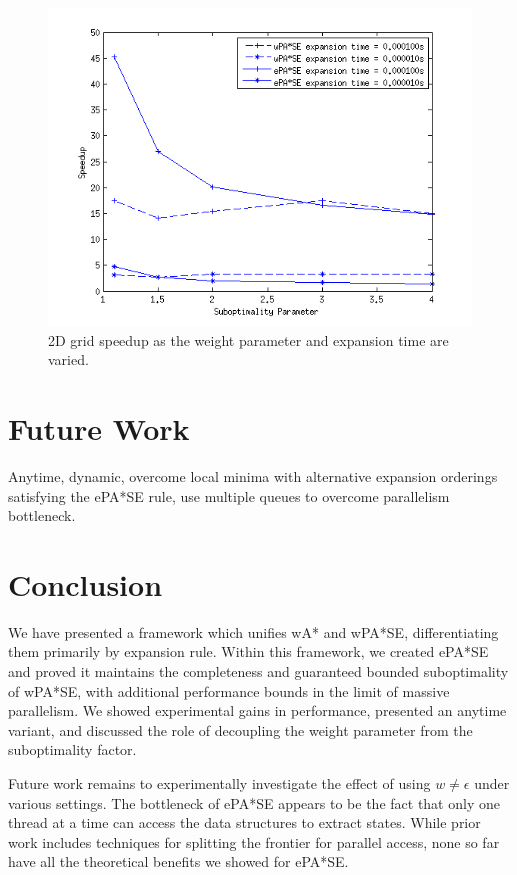 \documentclass[letterpaper]{article}
\begin{document}
\begin{figure}[fig:tps]
\centering\includegraphics[scale=0.55]{eps_sweep_para.png}
\caption{2D grid speedup as the weight parameter and expansion time are varied.}
\end{figure}

\section{Future Work}

Anytime, dynamic, overcome local minima with alternative expansion orderings satisfying the ePA*SE rule, use multiple queues to overcome parallelism bottleneck.

\section{Conclusion}

We have presented a framework which unifies wA* and wPA*SE, differentiating them primarily by expansion rule. Within this framework, we created ePA*SE and proved it maintains the completeness and guaranteed bounded suboptimality of wPA*SE, with additional performance bounds in the limit of massive parallelism. We showed experimental gains in performance, presented an anytime variant, and discussed the role of decoupling the weight parameter from the suboptimality factor.

Future work remains to experimentally investigate the effect of using $w \ne \epsilon$ under various settings. The bottleneck of ePA*SE appears to be the fact that only one thread at a time can access the data structures to extract states. While prior work includes techniques for splitting the frontier for parallel access, none so far have all the theoretical benefits we showed for ePA*SE.



\end{document}
